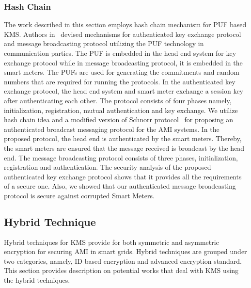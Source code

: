 \subsubsection{Hash Chain} The work described in this section employs hash chain mechanism for PUF based KMS.
Authors in~\cite{Delavar17} devised mechanisms for authenticated key exchange protocol and message broadcasting protocol utilizing the PUF technology in communication parties. The PUF is embedded in the head end system for key exchange protocol while in message broadcasting protocol, it is embedded in the smart meters. The PUFs are used for generating the commitments and random numbers that are required for running the protocols. In the authenticated key exchange protocol, the head end system and smart meter exchange a session key after authenticating each other. The protocol consists of four phases namely, initialization, registration, mutual authentication and key exchange. We utilize hash chain idea and a modified version of Schnorr protocol~\cite{Seurin2012} for proposing an authenticated broadcast messaging protocol for the AMI systems. In the proposed protocol, the head end is authenticated by the smart meters. Thereby, the smart meters are ensured that the message received is broadcast by the head end. The message broadcasting protocol consists of three phases, initialization, registration and authentication. The security analysis of the proposed authenticated key exchange protocol shows that it provides all the requirements of a secure one. Also, we showed that our authenticated message broadcasting protocol is secure against corrupted Smart Meters.     

\subsection{Hybrid Technique}
Hybrid techniques for KMS provide for both symmetric and asymmetric encryption for securing AMI in smart grids. Hybrid techniques are grouped under two categories, namely, ID based encryption and advanced encryption standard. This section provides description on potential works that deal with KMS using the hybrid techniques.

